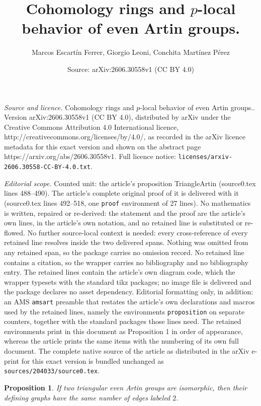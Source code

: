 \documentclass[10pt,a4paper]{amsart}
\title{Cohomology rings and $p$-local behavior of even Artin groups.}
\author{Marcos Escart\'in Ferrer, Giorgio Leoni, Conchita Mart\'inez P\'erez}
\date{Source: arXiv:2606.30558v1 (CC BY 4.0)}
\newtheorem{proposition}{Proposition}
\begin{document}
\maketitle

\noindent\emph{Source and licence.} Cohomology rings and $p$-local behavior of even Artin groups.. Version arXiv:2606.30558v1 (CC BY 4.0), distributed by arXiv under the Creative Commons Attribution 4.0 International licence, http://creativecommons.org/licenses/by/4.0/, as recorded in the arXiv licence metadata for this exact version and shown on the abstract page https://arxiv.org/abs/2606.30558v1. Full licence notice: \texttt{licenses/arxiv-2606.30558-CC-BY-4.0.txt}.\par\smallskip

\noindent\textit{Editorial scope.} Counted unit: the article's proposition TriangleArtin (source0.tex lines 488--490). The article's complete original proof of it is delivered with it (source0.tex lines 492--518, one \texttt{proof} environment of 27 lines). No mathematics is written, repaired or re-derived: the statement and the proof are the article's own lines, in the article's own notation, and no retained line is substituted or re-flowed.  No further source-local context is needed: every cross-reference of every retained line resolves inside the two delivered spans.  Nothing was omitted from any retained span, so the package carries no omission record.  No retained line contains a citation, so the wrapper carries no bibliography and no bibliography entry.  The retained lines contain the article's own diagram code, which the wrapper typesets with the standard tikz packages; no image file is delivered and the package declares no asset dependency.  Editorial formatting only, in addition: an AMS \texttt{amsart} preamble that restates the article's own declarations and macros used by the retained lines, namely the environments \texttt{proposition} on separate counters, together with the standard packages those lines need.  The retained environments print in this document as Proposition 1 in order of appearance, whereas the article prints the same items with the numbering of its own full document.  The complete native source of the article as distributed in the arXiv e-print for this exact version is bundled unchanged as \texttt{sources/204033/source0.tex}.
\begin{proposition}\label{TriangleArtin}
If two triangular even Artin groups are isomorphic, then their defining graphs have the same number of edges labeled $2$.
\end{proposition}
\end{document}
